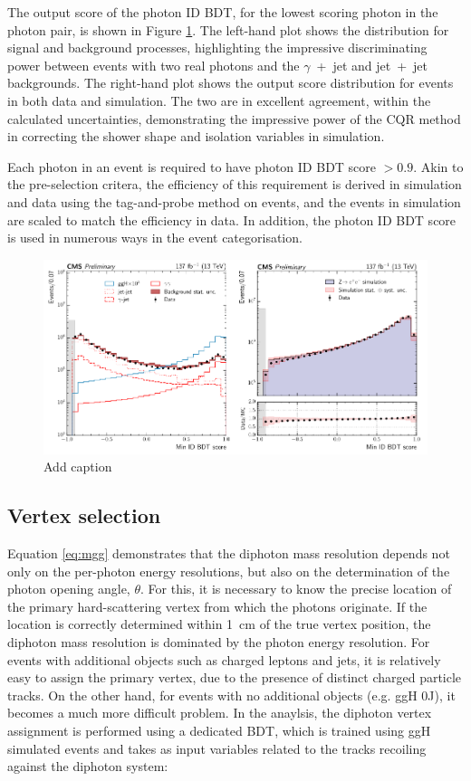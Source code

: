 The output score of the photon ID BDT, for the lowest scoring photon in the photon pair, is shown in Figure \ref{fig:photon_id_1}. The left-hand plot shows the distribution for signal and background processes, highlighting the impressive discriminating power between events with two real photons and the $\gamma$~+~jet and jet~+~jet backgrounds. The right-hand plot shows the output score distribution for \Zee events in both data and simulation. The two are in excellent agreement, within the calculated uncertainties, demonstrating the impressive power of the CQR method in correcting the shower shape and isolation variables in simulation. 

Each photon in an event is required to have photon ID BDT score $>0.9$. Akin to the pre-selection critera, the efficiency of this requirement is derived in simulation and data using the tag-and-probe method on \Zee events, and the events in simulation are scaled to match the efficiency in data. In addition, the photon ID BDT score is used in numerous ways in the event categorisation.

\begin{figure}[hptb]
  \centering
  \includegraphics[width=1\textwidth]{Figures/hgg_overview/photon_id_0.pdf}
  \caption[Photon ID output score distributions]
  {
    Add caption
  }
  \label{fig:photon_id_1}
\end{figure}

\subsection{Vertex selection}\label{sec:vertex_selection}
Equation \ref{eq:mgg} demonstrates that the diphoton mass resolution depends not only on the per-photon energy resolutions, but also on the determination of the photon opening angle, $\theta$. For this, it is necessary to know the precise location of the primary hard-scattering vertex from which the photons originate. If the location is correctly determined within 1~cm of the true vertex position, the diphoton mass resolution is dominated by the photon energy resolution. For events with additional objects such as charged leptons and jets, it is relatively easy to assign the primary vertex, due to the presence of distinct charged particle tracks. On the other hand, for \Hgg events with no additional objects (e.g. ggH 0J), it becomes a much more difficult problem. In the \Hgg anaylsis, the diphoton vertex assignment is performed using a dedicated BDT, which is trained using ggH \Hgg simulated events and takes as input variables related to the tracks recoiling against the diphoton system:

